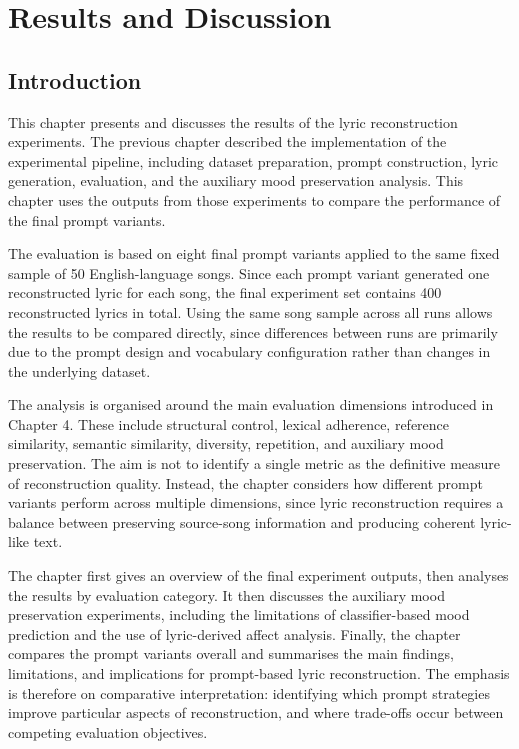 \chapter{Results and Discussion}

\section{Introduction}

This chapter presents and discusses the results of the lyric reconstruction experiments. The previous chapter described the implementation of the experimental pipeline, including dataset preparation, prompt construction, lyric generation, evaluation, and the auxiliary mood preservation analysis. This chapter uses the outputs from those experiments to compare the performance of the final prompt variants.

The evaluation is based on eight final prompt variants applied to the same fixed sample of 50 English-language songs. Since each prompt variant generated one reconstructed lyric for each song, the final experiment set contains 400 reconstructed lyrics in total. Using the same song sample across all runs allows the results to be compared directly, since differences between runs are primarily due to the prompt design and vocabulary configuration rather than changes in the underlying dataset.

The analysis is organised around the main evaluation dimensions introduced in Chapter 4. These include structural control, lexical adherence, reference similarity, semantic similarity, diversity, repetition, and auxiliary mood preservation. The aim is not to identify a single metric as the definitive measure of reconstruction quality. Instead, the chapter considers how different prompt variants perform across multiple dimensions, since lyric reconstruction requires a balance between preserving source-song information and producing coherent lyric-like text.

The chapter first gives an overview of the final experiment outputs, then analyses the results by evaluation category. It then discusses the auxiliary mood preservation experiments, including the limitations of classifier-based mood prediction and the use of lyric-derived affect analysis. Finally, the chapter compares the prompt variants overall and summarises the main findings, limitations, and implications for prompt-based lyric reconstruction. The emphasis is therefore on comparative interpretation: identifying which prompt strategies improve particular aspects of reconstruction, and where trade-offs occur between competing evaluation objectives.



